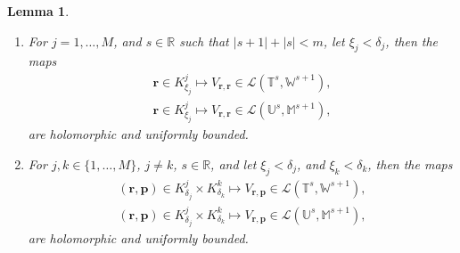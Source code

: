 \documentclass{article}
\newtheorem{lemma}[theorem]{Lemma}
\newcommand{\IM}{{\mathbb M}}
\newcommand{\IR}{{\mathbb R}}
\newcommand{\IU}{{\mathbb U}}
\newcommand{\IT}{{\mathbb T}}
\newcommand{\IW}{{\mathbb W}}
\newcommand{\bp}{{\bm p}}
\newcommand{\br}{\bm{r}}
\begin{document}
\begin{lemma}
\begin{enumerate}
\item 
For $j=1,\hdots,M$, and $s\in \IR$ such that $|s+1|+|s|<m$, let $\xi_j< \delta_j$, then the maps
\begin{align*}
\br \in K^j_{\xi_j} \mapsto V_{\br,\br} \in 
\mathcal{L}(\IT^s, \IW^{s+1}), \\
\br \in K^j_{\xi_j} \mapsto V_{\br,\br} \in 
\mathcal{L}(\IU^s, \IM^{s+1}),
\end{align*} 
are holomorphic and uniformly bounded. 
\item 
For $j,k \in \{1,\hdots,M\}$, $j \neq k$, $s \in \IR$, and let $\xi_j < \delta_j$, and $\xi_k  < \delta_k$, then the maps 
\begin{align*}
 (\br,\bp) \in K^j_{\delta_j} \times K^k_{\delta_k} \mapsto V_{\br,\bp} \in 
\mathcal{L}(\IT^s, \IW^{s+1}),\\
 (\br,\bp) \in K^j_{\delta_j} \times K^k_{\delta_k} \mapsto V_{\br,\bp} \in 
\mathcal{L}(\IU^s, \IM^{s+1}),
\end{align*}
are holomorphic and uniformly bounded. 
\end{enumerate}
\end{lemma}
\end{document}
